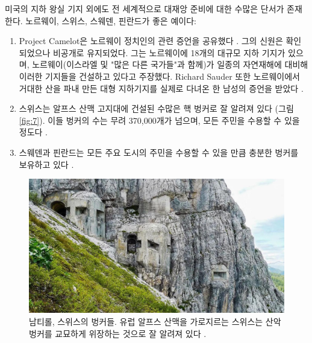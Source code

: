 \documentclass[10pt,twocolumn,letterpaper]{article}
\begin{document}
미국의 지하 왕실 기지 외에도 전 세계적으로 대재앙 준비에 대한 수많은 단서가 존재한다. 노르웨이, 스위스, 스웨덴, 핀란드가 좋은 예이다:

\begin{flushleft}
\begin{enumerate}
    \item Project Camelot은 노르웨이 정치인의 관련 증언을 공유했다 \cite{25,26}. 그의 신원은 확인되었으나 비공개로 유지되었다. 그는 노르웨이에 18개의 대규모 지하 기지가 있으며, 노르웨이(이스라엘 및 "많은 다른 국가들"과 함께)가 일종의 자연재해에 대비해 이러한 기지들을 건설하고 있다고 주장했다. Richard Sauder 또한 노르웨이에서 거대한 산을 파내 만든 대형 지하기지를 실제로 다녀온 한 남성의 증언을 받았다 \cite{22}.
    \item 스위스는 알프스 산맥 고지대에 건설된 수많은 핵 벙커로 잘 알려져 있다 (그림 \ref{fig:7}). 이들 벙커의 수는 무려 370,000개가 넘으며, 모든 주민을 수용할 수 있을 정도다 \cite{27}.
    \item 스웨덴과 핀란드는 모든 주요 도시의 주민을 수용할 수 있을 만큼 충분한 벙커를 보유하고 있다 \cite{27}.
\end{enumerate}
\end{flushleft}

\begin{figure}[t]
\begin{center}
   \includegraphics[width=1\linewidth]{tyrol.jpg}
\end{center}
   \caption{남티롤, 스위스의 벙커들. 유럽 알프스 산맥을 가로지르는 스위스는 산악 벙커를 교묘하게 위장하는 것으로 잘 알려져 있다 \cite{32}.}
\label{fig:7}
\label{fig:onecol}
\end{figure}
\end{document}

